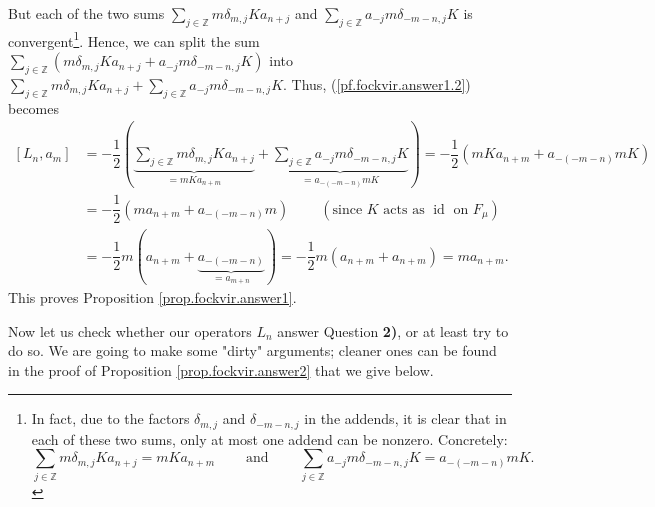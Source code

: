 \documentclass
[numbers=enddot,12pt,final,onecolumn,german,notitlepage]{scrartcl}%
\theoremstyle{definition}
\begin{document}
But each of the two sums $\sum\limits_{j\in\mathbb{Z}}m\delta_{m,j}Ka_{n+j}$
and $\sum\limits_{j\in\mathbb{Z}}a_{-j}m\delta_{-m-n,j}K$ is
convergent\footnote{In fact, due to the factors $\delta_{m,j}$ and
$\delta_{-m-n,j}$ in the addends, it is clear that in each of these two sums,
only at most one addend can be nonzero. Concretely:%
\[
\sum\limits_{j\in\mathbb{Z}}m\delta_{m,j}Ka_{n+j}=mKa_{n+m}%
\ \ \ \ \ \ \ \ \ \ \text{and}\ \ \ \ \ \ \ \ \ \ \sum\limits_{j\in\mathbb{Z}%
}a_{-j}m\delta_{-m-n,j}K=a_{-\left(  -m-n\right)  }mK.
\]
}. Hence, we can split the sum $\sum\limits_{j\in\mathbb{Z}}\left(
m\delta_{m,j}Ka_{n+j}+a_{-j}m\delta_{-m-n,j}K\right)  $ into $\sum
\limits_{j\in\mathbb{Z}}m\delta_{m,j}Ka_{n+j}+\sum\limits_{j\in\mathbb{Z}%
}a_{-j}m\delta_{-m-n,j}K$. Thus, (\ref{pf.fockvir.answer1.2}) becomes%
\begin{align*}
\left[  L_{n},a_{m}\right]   &  =-\dfrac{1}{2}\left(  \underbrace{\sum
\limits_{j\in\mathbb{Z}}m\delta_{m,j}Ka_{n+j}}_{=mKa_{n+m}}+\underbrace{\sum
\limits_{j\in\mathbb{Z}}a_{-j}m\delta_{-m-n,j}K}_{=a_{-\left(  -m-n\right)
}mK}\right)  =-\dfrac{1}{2}\left(  mKa_{n+m}+a_{-\left(  -m-n\right)
}mK\right) \\
&  =-\dfrac{1}{2}\left(  ma_{n+m}+a_{-\left(  -m-n\right)  }m\right)
\ \ \ \ \ \ \ \ \ \ \left(  \text{since }K\text{ acts as }\operatorname*{id}%
\text{ on }F_{\mu}\right) \\
&  =-\dfrac{1}{2}m\left(  a_{n+m}+\underbrace{a_{-\left(  -m-n\right)  }%
}_{=a_{m+n}}\right)  =-\dfrac{1}{2}m\left(  a_{n+m}+a_{n+m}\right)  =ma_{n+m}.
\end{align*}
This proves Proposition \ref{prop.fockvir.answer1}.

Now let us check whether our operators $L_{n}$ answer Question \textbf{2)}, or
at least try to do so. We are going to make some "dirty" arguments; cleaner
ones can be found in the proof of Proposition \ref{prop.fockvir.answer2} that
we give below.
\end{document}
